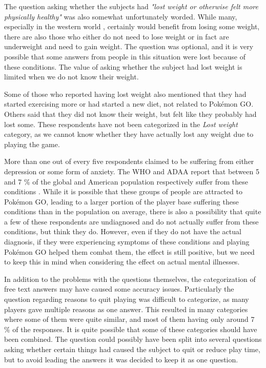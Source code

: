 The question asking whether the subjects had \emph{"lost weight or otherwise felt more physically healthy"} was also somewhat unfortunately worded. While many, especially in the western world , certainly would benefit from losing some weight, there are also those who either do not need to lose weight or in fact are underweight and need to gain weight. The question was optional, and it is very possible that some answers from people in this situation were lost because of these conditions. The value of asking whether the subject had lost weight is limited when we do not know their weight.

Some of those who reported having lost weight also mentioned that they had started exercising more or had started a new diet, not related to Pokémon GO. Others said that they did not know their weight, but felt like they probably had lost some. These respondents have not been categorized in the \emph{Lost weight} category, as we cannot know whether they have actually lost any weight due to playing the game. 

More than one out of every five respondents claimed to be suffering from either depression or some form of anxiety. The WHO and ADAA report that between 5 and 7 \% of the global and American population respectively suffer from these conditions . While it is possible that these groups of people are attracted to Pokémon GO, leading to a larger portion of the player base suffering these conditions than in the population on average, there is also a possibility that quite a few of these respondents are undiagnosed and do not actually suffer from these conditions, but think they do. However, even if they do not have the actual diagnosis, if they were experiencing symptoms of these conditions and playing Pokémon GO helped them combat them, the effect is still positive, but we need to keep this in mind when considering the effect on actual mental illnesses.

In addition to the problems with the questions themselves, the categorization of free text answers may have caused some accuracy issues. Particularly the question regarding reasons to quit playing was difficult to categorize, as many players gave multiple reasons as one answer. This resulted in many categories where some of them were quite similar, and most of them having only around 7 \% of the responses. It is quite possible that some of these categories should have been combined. The question could possibly have been split into several questions asking whether certain things had caused the subject to quit or reduce play time, but to avoid leading the answers it was decided to keep it as one question.

